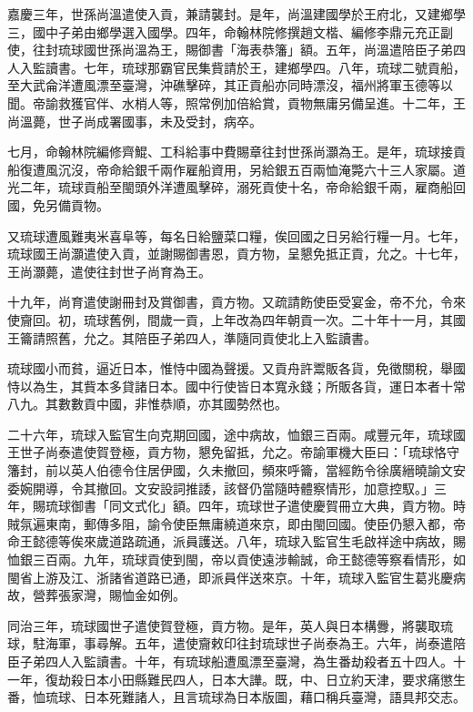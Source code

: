 \begin{pinyinscope}
嘉慶三年，世孫尚溫遣使入貢，兼請襲封。是年，尚溫建國學於王府北，又建鄉學三，國中子弟由鄉學選入國學。四年，命翰林院修撰趙文楷、編修李鼎元充正副使，往封琉球國世孫尚溫為王，賜御書「海表恭籓」額。五年，尚溫遣陪臣子弟四人入監讀書。七年，琉球那霸官民集貲請於王，建鄉學四。八年，琉球二號貢船，至大武侖洋遭風漂至臺灣，沖礁擊碎，其正貢船亦同時漂沒，福州將軍玉德等以聞。帝諭救獲官伴、水梢人等，照常例加倍給賞，貢物無庸另備呈進。十二年，王尚溫薨，世子尚成署國事，未及受封，病卒。

七月，命翰林院編修齊鯤、工科給事中費賜章往封世孫尚灝為王。是年，琉球接貢船復遭風沉沒，帝命給銀千兩作雇船資用，另給銀五百兩恤淹斃六十三人家屬。道光二年，琉球貢船至閩頭外洋遭風擊碎，溺死貢使十名，帝命給銀千兩，雇商船回國，免另備貢物。

又琉球遭風難夷米喜阜等，每名日給鹽菜口糧，俟回國之日另給行糧一月。七年，琉球國王尚灝遣使入貢，並謝賜御書恩，貢方物，呈懇免抵正貢，允之。十七年，王尚灝薨，遣使往封世子尚育為王。

十九年，尚育遣使謝冊封及賞御書，貢方物。又疏請飭使臣受宴金，帝不允，令來使齎回。初，琉球舊例，間歲一貢，上年改為四年朝貢一次。二十年十一月，其國王籥請照舊，允之。其陪臣子弟四人，準隨同貢使北上入監讀書。

琉球國小而貧，逼近日本，惟恃中國為聲援。又貢舟許鬻販各貨，免徵關稅，舉國恃以為生，其貲本多貸諸日本。國中行使皆日本寬永錢；所販各貨，運日本者十常八九。其數數貢中國，非惟恭順，亦其國勢然也。

二十六年，琉球入監官生向克期回國，途中病故，恤銀三百兩。咸豐元年，琉球國王世子尚泰遣使賀登極，貢方物，懇免留抵，允之。帝諭軍機大臣曰：「琉球恪守籓封，前以英人伯德令住居伊國，久未撤回，頻來呼籥，當經飭令徐廣縉曉諭文安委婉開導，令其撤回。文安設詞推諉，該督仍當隨時體察情形，加意控馭。」三年，賜琉球御書「同文式化」額。四年，琉球世子遣使慶賀冊立大典，貢方物。時賊氛遍東南，郵傳多阻，諭令使臣無庸繞道來京，即由閩回國。使臣仍懇入都，帝命王懿德等俟來歲道路疏通，派員護送。八年，琉球入監官生毛啟祥途中病故，賜恤銀三百兩。九年，琉球貢使到閩，帝以貢使遠涉輸誠，命王懿德等察看情形，如閩省上游及江、浙諸省道路已通，即派員伴送來京。十年，琉球入監官生葛兆慶病故，營葬張家灣，賜恤金如例。

同治三年，琉球國世子遣使賀登極，貢方物。是年，英人與日本構釁，將襲取琉球，駐海軍，事尋解。五年，遣使齎敕印往封琉球世子尚泰為王。六年，尚泰遣陪臣子弟四人入監讀書。十年，有琉球船遭風漂至臺灣，為生番劫殺者五十四人。十一年，復劫殺日本小田縣難民四人，日本大譁。既，中、日立約天津，要求痛懲生番，恤琉球、日本死難諸人，且言琉球為日本版圖，藉口稱兵臺灣，語具邦交志。


\end{pinyinscope}

